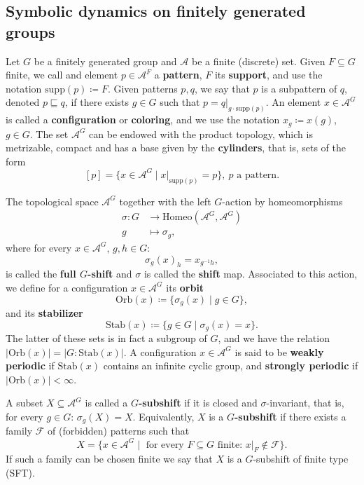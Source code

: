 \documentclass[letterpaper,10pt]{amsart}
\theoremstyle{plain}
\begin{document}
	\subsection{Symbolic dynamics on finitely generated groups}
	Let $G$ be a finitely generated group and $\mathcal{A}$ be a finite (discrete) set. Given $F\subseteq G$ finite, we call and element $p\in \mathcal{A}^{F}$ a \textbf{pattern}, $F$ its \textbf{support}, and use the notation $\mathrm{supp}(p)\coloneqq F$. Given patterns $p,q$, we say that $p$ is a subpattern of $q$, denoted $p\sqsubseteq q$, if there exists $g\in G$ such that $p=q|_{g\cdot \mathrm{supp}(p)}$. An element $x\in \mathcal{A}^G$ is called a \textbf{configuration} or \textbf{coloring}, and we use the notation $x_g\coloneqq x(g)$, $g\in G$. The set $\mathcal{A}^G$ can be endowed with the product topology, which is metrizable, compact and has a base given by the \textbf{cylinders}, that is, sets of the form
	$$
	[p]=\{x\in \mathcal{A}^G\mid x|_{\mathrm{supp}(p)}=p \}, \ p\text{ a pattern}.
	$$ 


	The topological space $\mathcal{A}^G$ together with the left $G$-action by homeomorphisms
	\begin{align*}
	\sigma:G&\to \mathrm{Homeo}(\mathcal{A}^G,\mathcal{A}^G)\\
	g&\mapsto \sigma_g,
	\end{align*}
	where for every $x\in \mathcal{A}^G$, $g,h\in G$:
	$$
	\sigma_g(x)_h=x_{g^{-1}h},
	$$
	is called the \textbf{full $G$-shift} and $\sigma$ is called the \textbf{shift} map. Associated to this action, we define for a configuration $x\in \mathcal{A}^G$ its \textbf{orbit} $$\mathrm{Orb}(x)\coloneqq\{\sigma_g(x)\mid g\in G \},$$ and its \textbf{stabilizer} $$\mathrm{Stab}(x)\coloneqq \{g\in G\mid \sigma_g(x)=x \}.$$ The latter of these sets is in fact a subgroup of $G$, and we have the relation $|\mathrm{Orb}(x)|=|G:\mathrm{Stab}(x)|$. A configuration $x\in \mathcal{A}^G$ is said to be \textbf{weakly periodic} if $\mathrm{Stab}(x)$ contains an infinite cyclic group, and \textbf{strongly periodic} if $|\mathrm{Orb}(x)|<\infty$.
	
	
	A subset $X\subseteq \mathcal{A}^G$ is called a \textbf{$G$-subshift} if it is closed and $\sigma$-invariant, that is, for every $g\in G$: $\sigma_g(X)=X$. Equivalently, $X$ is a \textbf{$G$-subshift} if there exists a family $\mathcal{F}$ of (forbidden) patterns such that
	$$
	X=\{x\in \mathcal{A}^G\mid \text{ for every }F\subseteq G \text{ finite: }x|_{F}\notin \mathcal{F}  \}.
	$$ 
	If such a family can be chosen finite we say that $X$ is a $G$-subshift of finite type (SFT).
	
\end{document}

